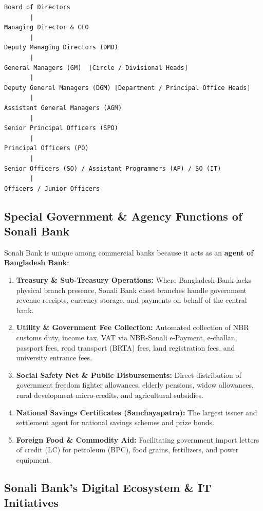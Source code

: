 \begin{lstlisting}
Board of Directors
       |
Managing Director & CEO
       |
Deputy Managing Directors (DMD)
       |
General Managers (GM)  [Circle / Divisional Heads]
       |
Deputy General Managers (DGM) [Department / Principal Office Heads]
       |
Assistant General Managers (AGM)
       |
Senior Principal Officers (SPO)
       |
Principal Officers (PO)
       |
Senior Officers (SO) / Assistant Programmers (AP) / SO (IT)
       |
Officers / Junior Officers
\end{lstlisting}

\medskip

\subsection{Special Government \& Agency Functions of Sonali Bank}

Sonali Bank is unique among commercial banks because it acts as an \textbf{agent of Bangladesh Bank}:

\begin{enumerate}
  \item \textbf{Treasury \& Sub-Treasury Operations:} Where Bangladesh Bank lacks physical branch presence, Sonali Bank chest branches handle government revenue receipts, currency storage, and payments on behalf of the central bank.
  \item \textbf{Utility \& Government Fee Collection:} Automated collection of NBR customs duty, income tax, VAT via NBR-Sonali e-Payment, e-challan, passport fees, road transport (BRTA) fees, land registration fees, and university entrance fees.
  \item \textbf{Social Safety Net \& Public Disbursements:} Direct distribution of government freedom fighter allowances, elderly pensions, widow allowances, rural development micro-credits, and agricultural subsidies.
  \item \textbf{National Savings Certificates (Sanchayapatra):} The largest issuer and settlement agent for national savings schemes and prize bonds.
  \item \textbf{Foreign Food \& Commodity Aid:} Facilitating government import letters of credit (LC) for petroleum (BPC), food grains, fertilizers, and power equipment.
\end{enumerate}

\medskip

\subsection{Sonali Bank's Digital Ecosystem \& IT Initiatives}

